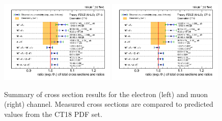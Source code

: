 \begin{figure}[htpb]
\includegraphics[width=0.49\textwidth]{plots/Results/xsecSummary13TeV_ele_ct18.png}
\includegraphics[width=0.49\textwidth]{plots/Results/xsecSummary13TeV_muon_ct18.png}
\caption{Summary of cross section results for the \sh electron (left) and muon (right) channel. Measured cross sections are compared to predicted values from the CT18 PDF set.}
\label{fig:xs:ct18:13}
\end{figure}